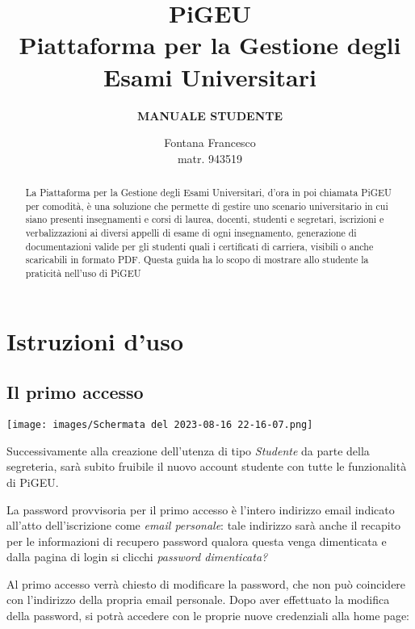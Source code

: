 \documentclass{article}
\title{PiGEU\\ Piattaforma per la Gestione degli Esami Universitari}
\author{\textbf{MANUALE STUDENTE}}
\date{Fontana Francesco \\ matr. 943519}
\begin{document}
    \maketitle

    \begin{abstract}

        La Piattaforma per la Gestione degli Esami Universitari, d'ora in poi chiamata PiGEU per comodità, è una soluzione che permette di gestire
        uno scenario universitario in cui siano presenti insegnamenti e corsi di laurea, docenti, studenti e segretari, iscrizioni e verbalizzazioni
        ai diversi appelli di esame di ogni insegnamento, generazione di documentazioni valide per gli studenti quali i certificati di carriera, visibili
        o anche scaricabili in formato PDF.
        Questa guida ha lo scopo di mostrare allo studente la praticità nell'uso di PiGEU
    \end{abstract}

    \pagebreak

    \tableofcontents

    \pagebreak

    \section{Istruzioni d'uso}

    \subsection{Il primo accesso}

    \texttt{[image: images/Schermata del 2023-08-16 22-16-07.png]}

    Successivamente alla creazione dell'utenza di tipo \textit{Studente} da parte della segreteria, sarà subito fruibile il nuovo account studente con tutte le funzionalità di PiGEU.

    La password provvisoria per il primo accesso è l'intero indirizzo email indicato all'atto dell'iscrizione come \textit{email personale}: tale indirizzo sarà anche il recapito per le informazioni di recupero password qualora questa venga dimenticata e dalla pagina di login si clicchi \textit{password dimenticata?}

    Al primo accesso verrà chiesto di modificare la password, che non può coincidere con l'indirizzo della propria email personale. Dopo aver effettuato la modifica della password, si potrà accedere con le proprie nuove credenziali alla home page:
\end{document}
